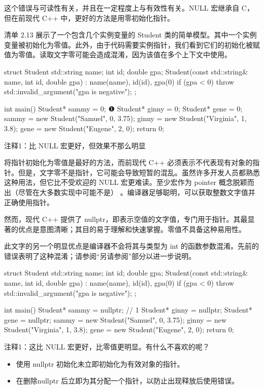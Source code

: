 这个错误与可读性有关，并且在一定程度上与有效性有关。NULL 宏继承自 C，但在前现代 C++ 中，更好的方法是用零初始化指针。


清单 2.13 展示了一个包含几个实例变量的 Student 类的简单模型。其中一个实例变量被初始化为零值。此外，由于代码需要实例指针，我们看到它们的初始化被赋值为零值。读取文字零可能会造成混淆，因为该值在多个上下文中使用。


\begin{cpp}
struct Student {
  std::string name;
  int id;
  double gpa;
  Student(const std::string& name, int id, double gpa) : name(name),
          id(id), gpa(0) {
    if (gpa < 0)
      throw std::invalid_argument("gpa is negative");
  }
};

int main() {
  Student* sammy = 0; ❶
  Student* ginny = 0;
  Student* gene = 0;
  sammy = new Student("Samuel", 0, 3.75);
  ginny = new Student("Virginia", 1, 3.8);
  gene = new Student("Eugene", 2, 0);
  return 0;
}
\end{cpp}

{\footnotesize
注释1：比 NULL 宏更好，但效果不那么明显
}


将指针初始化为零值是最好的方法，而前现代 C++ 必须表示不代表现有对象的指针。但是，文字零不是指针，它可能会导致短暂的混乱。虽然许多开发人员都熟悉这种用法，但它比不受欢迎的 NULL 宏更难读。至少宏作为 pointer 概念脱颖而出（尽管在大多数实现中可能不是） 。编译器足够聪明，可以获取整数文字值并正确使用指针。


然而，现代 C++ 提供了 nullptr，即表示空值的文字值，专门用于指针。其最显著的优点是意图清晰；其目的易于理解和快速掌握。零值不具备这种易用性。

此文字的另一个明显优点是编译器不会将其与类型为 int 的函数参数混淆。先前的错误表明了这种混淆；请参阅“另请参阅”部分以进一步说明。


\begin{cpp}
struct Student {
  std::string name;
  int id;
  double gpa;
  Student(const std::string& name, int id, double gpa) : name(name),
          id(id), gpa(0) {
    if (gpa < 0)
      throw std::invalid_argument("gpa is negative");
  }
};

int main() {
  Student* sammy = nullptr; // 1
  Student* ginny = nullptr;
  Student* gene = nullptr;
  sammy = new Student("Samuel", 0, 3.75);
  ginny = new Student("Virginia", 1, 3.8);
  gene = new Student("Eugene", 2, 0);
  return 0;
}
\end{cpp}

{\footnotesize
注释1：这比 NULL 宏更好，比零值更明显。有什么不喜欢的呢？
}


\begin{itemize}
\item
使用 nullptr 初始化未立即初始化为有效对象的指针。

\item
在删除nullptr 后立即为其分配一个指针，以防止出现释放后使用错误。
\end{itemize}
